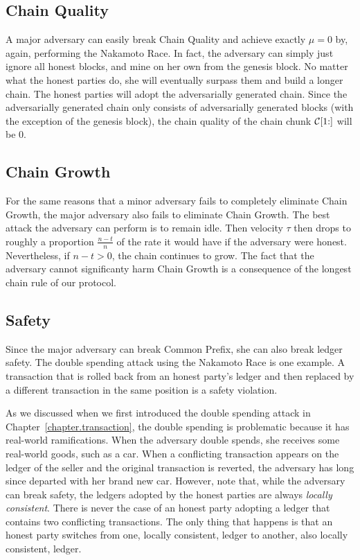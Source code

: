 \subsection*{Chain Quality}
A major adversary can easily break Chain Quality and achieve exactly $\mu = 0$ by, again,
performing the Nakamoto Race. In fact, the adversary can simply just ignore all honest blocks,
and mine on her own from the genesis block. No matter what the honest parties do, she will eventually
surpass them and build a longer chain. The honest parties will adopt the adversarially generated
chain. Since the adversarially generated chain only consists of adversarially generated blocks
(with the exception of the genesis block), the chain quality of the chain chunk $\mathcal{C}[1{:}]$
will be $0$.

\subsection*{Chain Growth}
For the same reasons that a minor adversary fails to completely eliminate Chain Growth, the
major adversary also fails to eliminate Chain Growth. The best attack the adversary can perform
is to remain idle. Then velocity $\tau$ then drops to roughly a proportion $\frac{n - t}{n}$ of the rate
it would have if the adversary were honest. Nevertheless, if $n - t > 0$, the chain continues
to grow. The fact that the adversary cannot significanty harm Chain Growth is a consequence of
the longest chain rule of our protocol.

\subsection*{Safety}
Since the major adversary can break Common Prefix, she can also break ledger safety. The double
spending attack using the Nakamoto Race is one example. A transaction that is rolled back from
an honest party's ledger and then replaced by a different transaction in the same position
is a safety violation.

As we discussed when we first introduced the double spending attack in Chapter~\ref{chapter.transaction},
the double spending is problematic because it has real-world ramifications. When the adversary double
spends, she receives some real-world goods, such as a car. When a conflicting transaction appears on
the ledger of the seller and the original transaction is reverted, the adversary has long since
departed with her brand new car. However, note that, while the adversary can break safety, the
ledgers adopted by the honest parties are always \emph{locally consistent}. There is never the
case of an honest party adopting a ledger that contains two conflicting transactions. The only
thing that happens is that an honest party switches from one, locally consistent, ledger to another,
also locally consistent, ledger.

